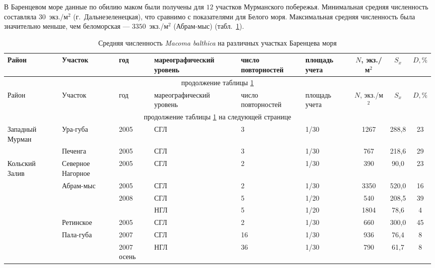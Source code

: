 В Баренцевом море данные по обилию маком были получены для $12$ участков Мурманского побережья.
Минимальная средняя численность составляла $30$~экз./м$^2$ (г.~Дальнезеленецкая), что сравнимо с показателями для Белого моря. 
Максимальная средняя численность была значительно меньше, чем беломорская --- $3350$~экз./м$^2$ (Абрам-мыс) (табл.~\ref{tab:mean_N_Barents}). 
	\begin{footnotesize}
        \begin{center}
	\begin{longtable}{|p{1.6cm}|p{2.3cm}|p{1cm}|p{2cm}|p{1.5cm}|p{1.3cm}|*{3}{c|}}
	\caption{Средняя численность {\it Macoma balthica} на различных участках Баренцева моря}\label{tab:mean_N_Barents}\\
	\hline
	Район & Участок & год & ма\-ре\-ографи\-ческий уровень & число повторностей & площадь учета & $N$, экз./м$^2$ & $S_x$  & $D, \%$ 
	\\ \hline \endfirsthead
	\hline
	\multicolumn{9}{|c|}{продолжение таблицы \ref{tab:mean_N_Barents}} \\ \hline
	Район & Участок & год & ма\-ре\-ографи\-ческий уровень & число повторностей & площадь учета & $N$, экз./м$^2$ & $S_x$  & $D, \%$ 
	\\ \hline \endhead
	\hline 
	\multicolumn{9}{|c|}{продолжение таблицы \ref{tab:mean_N_Barents} на следующей странице}
	\\ \hline \endfoot
	\endlastfoot
	Западный Мурман & Ура-губа & 2005 & СГЛ & 3 & 1/30 & 1267 & 288,8 & 23
		\\ \cline{2-9}
		 & Печенга & 2005 & СГЛ & 3 & 1/30 & 767 & 218,6 & 29
		\\ \hline
	Кольский Залив & Северное Нагорное & 2005 & СГЛ & 2 & 1/30 & 390 & 90,0 & 23
		\\ \cline{2-9}
		 & Абрам-мыс & 2005 & СГЛ & 2 & 1/30 & 3350 & 520,0 & 16
		\\ \cline{3-9}
		 &  & 2008 & СГЛ & 5 & 1/20 & 540 & 208,5 & 39
		\\ \cline{4-9}
		 &  &  & НГЛ & 5 & 1/20 & 1804 & 78,6 & 4
		\\ \cline{2-9}
		 & Ретинское & 2005 & СГЛ & 2 & 1/30 & 660 & 300,0 & 45
		\\ \cline{2-9}
		 & Пала-губа & 2007 & СГЛ & 16 & 1/30 & 936 & 76,4 & 8
		\\ \cline{3-9}
		 &  & 2007 осень & НГЛ & 36 & 1/30 & 790 & 61,7 & 8
		\\ \cline{3-9}

\end{longtable}
\end{center}
\end{footnotesize}
